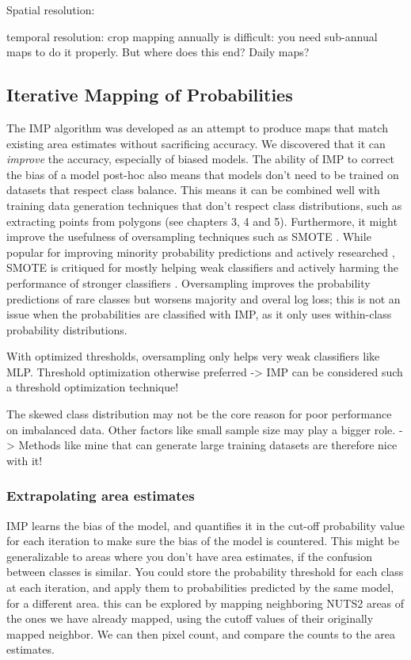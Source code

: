     Spatial resolution:
        
    temporal resolution:
    crop mapping annually is difficult: you need sub-annual maps to do it properly. But where does this end? Daily maps?
    
    \subsection{Iterative Mapping of Probabilities}

        The IMP algorithm was developed as an attempt to produce maps that match existing area estimates without sacrificing accuracy. We discovered that it can \textit{improve} the accuracy, especially of biased models. The ability of IMP to correct the bias of a model post-hoc also means that models don't need to be trained on datasets that respect class balance. This means it can be combined well with training data generation techniques that don't respect class distributions, such as extracting points from polygons (see chapters 3, 4 and 5). Furthermore, it might improve the usefulness of oversampling techniques such as SMOTE  \citep{chawla2002smote}. While popular for improving minority probability predictions \citep{elor2022smote} and actively researched \citep{douzas2019imbalanced}, SMOTE is critiqued for mostly helping weak classifiers and actively harming the performance of stronger classifiers \citep{elor2022smote}. Oversampling improves the probability predictions of rare classes but worsens majority and overal log loss; this is not an issue when the probabilities are classified with IMP, as it only uses within-class probability distributions.
        
        With optimized thresholds, oversampling only helps very weak classifiers like MLP. Threshold optimization otherwise preferred \citep{elor2022smote} -> IMP can be considered such a threshold optimization technique!

        The skewed class distribution may not be the core reason for poor performance on imbalanced data. Other factors like small sample size may play a bigger role. \citep{elor2022smote} -> Methods like mine that can generate large training datasets are therefore nice with it!
        

        \subsubsection{Extrapolating area estimates}
            IMP learns the bias of the model, and quantifies it in the cut-off probability value for each iteration to make sure the bias of the model is countered. This might be generalizable to areas where you don't have area estimates, if the confusion between classes is similar.
            You could store the probability threshold for each class at each iteration, and apply them to probabilities predicted by the same model, for a different area.
            this can be explored by mapping neighboring NUTS2 areas of the ones we have already mapped, using the cutoff values of their originally mapped neighbor. We can then pixel count, and compare the counts to the area estimates.

